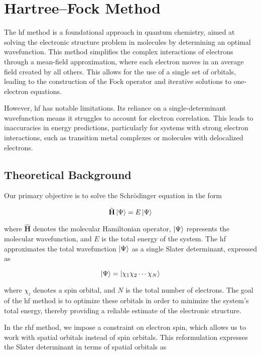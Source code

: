 \chapter{Hartree--Fock Method}

The \acrshort{hf} method is a foundational approach in quantum chemistry, aimed at solving the electronic structure problem in molecules by determining an optimal wavefunction. This method simplifies the complex interactions of electrons through a mean-field approximation, where each electron moves in an average field created by all others. This allows for the use of a single set of orbitals, leading to the construction of the Fock operator and iterative solutions to one-electron equations.

However, \acrshort{hf} has notable limitations. Its reliance on a single-determinant wavefunction means it struggles to account for electron correlation. This leads to inaccuracies in energy predictions, particularly for systems with strong electron interactions, such as transition metal complexes or molecules with delocalized electrons.

\section{Theoretical Background}

Our primary objective is to solve the Schrödinger equation in the form

\begin{equation}
\hat{\mathbf{H}}\ket{\Psi}=E\ket{\Psi}
\end{equation}

where \(\hat{\mathbf{H}}\) denotes the molecular Hamiltonian operator, \(\ket{\Psi}\) represents the molecular wavefunction, and \(E\) is the total energy of the system. The \acrshort{hf} approximates the total wavefunction \(\ket{\Psi}\) as a single Slater determinant, expressed as

\begin{equation}
\ket{\Psi}=\ket{\chi_1\chi_2\cdots\chi_N}
\end{equation}

where \(\chi_i\) denotes a spin orbital, and \(N\) is the total number of electrons. The goal of the \acrshort{hf} method is to optimize these orbitals in order to minimize the system's total energy, thereby providing a reliable estimate of the electronic structure.

In the \acrfull{rhf} method, we impose a constraint on electron spin, which allows us to work with spatial orbitals instead of spin orbitals. This reformulation expresses the Slater determinant in terms of spatial orbitals as


